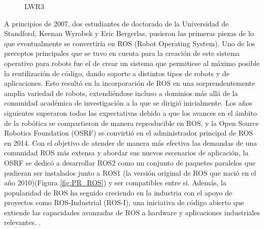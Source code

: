   \begin{figure}[h!]
    \begin{center}
      \subcapcentertrue
      \hspace{2mm}
    \end{center}
    \caption{LWR3}
    \label{fig:Lightweight Robot (LWR)}
  \end{figure}
  
A principios de 2007, dos estudiantes de doctorado de la Universidad de Standford, Keenan Wyrobek y Eric Bergerlas, pusieron las primeras piezas de lo que eventualmente se convertiría en ROS (Robot Operating System). Uno de los preceptos principales que se tuvo en cuenta para la creación de este sistema operativo para robots fue el de crear un sistema que permitiese al máximo posible la reutilización de código, dando soporte a distintos tipos de robots y de aplicaciones. Esto resultó en la incorporación de ROS en una sorprendentemente amplia variedad de robots, extendiéndose incluso a dominios más allá de la comunidad académica de investigación a la que se dirigió inicialmente. Los años siguientes superaron todas las expectativas debido a que los avances en el ámbito de la robótica se compartieron de manera reproducible en ROS, y la Open Source Robotics Foundation (OSRF) se convirtió en el administrador principal de ROS en 2014. Con el objetivo de atender de manera más efectiva las demandas de una comunidad ROS más extensa y abordar sus nuevos escenarios de aplicación, la OSRF se dedicó a desarrollar ROS2 como un conjunto de paquetes paralelos que pudieran ser instalados junto a ROS1 (la versión original de ROS que nació en el año 2010)(Figura \ref{fig:PR_ROS}) y ser compatibles entre sí. Además, la popularidad de ROS ha seguido creciendo en la industria con el apoyo de proyectos como ROS-Industrial (ROS-I), una iniciativa de código abierto que extiende las capacidades avanzadas de ROS a hardware y aplicaciones industriales relevantes. \cite{Suarez22}.\\
  
